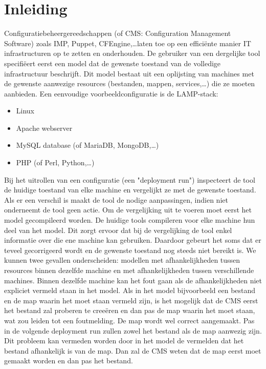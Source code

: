 \chapter{Inleiding}
\label{inleiding}
Configuratiebeheergereedschappen (of CMS: Configuration Management Software) zoals IMP, Puppet, CFEngine,\ldots laten toe op een effici\"ente manier IT infrastructuren op te zetten en onderhouden.
De gebruiker van een dergelijke tool specifi\"eert eerst een model dat de gewenste toestand van de volledige infrastructuur beschrijft.
Dit model bestaat uit een oplijsting van machines met de gewenste aanwezige resources (bestanden, mappen, services,\ldots) die ze moeten aanbieden.
Een eenvoudige voorbeeldconfiguratie is de LAMP-stack: 
\begin{itemize}
  \item Linux
  \item Apache webserver
  \item MySQL database (of MariaDB, MongoDB,\ldots)
  \item PHP (of Perl, Python,\ldots)
\end{itemize}

Bij het uitrollen van een configuratie (een "deployment run") inspecteert de tool de huidige toestand van elke machine en vergelijkt ze met de gewenste toestand.
Als er een verschil is maakt de tool de nodige aanpassingen, indien niet onderneemt de tool geen actie.
Om de vergelijking uit te voeren moet eerst het model gecompileerd worden.
De huidige tools compileren voor elke machine hun deel van het model.
Dit zorgt ervoor dat bij de vergelijking de tool enkel informatie over die ene machine kan gebruiken.
Daardoor gebeurt het soms dat er teveel gecorrigeerd wordt en de gewenste toestand nog steeds niet bereikt is.
We kunnen twee gevallen onderscheiden: modellen met afhankelijkheden tussen resources binnen dezelfde machine en met afhankelijkheden tussen verschillende machines.
Binnen dezelfde machine kan het fout gaan als de afhankelijkheden niet expliciet vermeld staan in het model. 
Als in het model bijvoorbeeld een bestand en de map waarin het moet staan vermeld zijn, is het mogelijk dat de CMS eerst het bestand zal
proberen te cree\"eren en dan pas de map waarin het moet staan, wat zou leiden tot een foutmelding. De map wordt wel correct aangemaakt.
Pas in de volgende deployment run zullen zowel het bestand als de map aanwezig zijn.
Dit probleem kan vermeden worden door in het model de vermelden dat het bestand afhankelijk is van de map.
Dan zal de CMS weten dat de map eerst moet gemaakt worden en dan pas het bestand.

